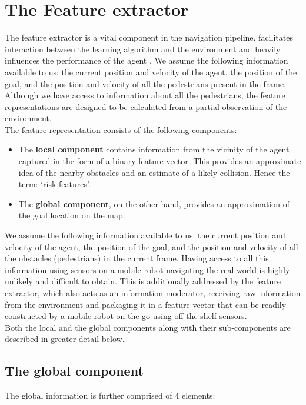 \section{The Feature extractor}
The feature extractor is a vital component in the navigation pipeline.  facilitates interaction between the learning algorithm and the environment and heavily influences the performance of the agent \cite{vasquez_inverse_2014}. We assume the following information available to us: the current position and velocity of the agent, the position of the goal, and the position and velocity of all the pedestrians present in the frame. Although we have access to information about all the pedestrians, the feature representations are designed to be calculated from a partial observation of the environment.\\
The feature representation consists of the following components:
\begin{itemize}
    \item The \textbf{local component} contains information from the vicinity of the agent captured in the form of a binary feature vector. This provides an approximate idea of the nearby obstacles and an estimate of a likely collision. Hence the term: `risk-features'. 
    \item The \textbf{global component}, on the other hand, provides an approximation of the goal location on the map. 
\end{itemize}
 We assume the following information available to us: the current position and velocity of the agent, the position of the goal, and the position and velocity of all the obstacles (pedestrians) in the current frame.  Having access to all this information using sensors on a mobile robot navigating the real world is highly unlikely and difficult to obtain. This is additionally addressed by the feature extractor, which also acts as an information moderator, receiving raw information from the environment and packaging it in a feature vector that can be readily constructed by a mobile robot on the go using off-the-shelf sensors.\\
 Both the local and the global components along with their sub-components are described in greater detail below.

\subsection*{The global component}
The global information is further comprised of 4 elements: 
